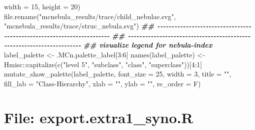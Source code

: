 \documentclass[
]{article}
\newenvironment{Shaded}{\begin{snugshade}}{\end{snugshade}}
\newcommand{\AttributeTok}[1]{\textcolor[rgb]{0.77,0.63,0.00}{#1}}
\newcommand{\DecValTok}[1]{\textcolor[rgb]{0.00,0.00,0.81}{#1}}
\newcommand{\DocumentationTok}[1]{\textcolor[rgb]{0.56,0.35,0.01}{\textbf{\textit{#1}}}}
\newcommand{\FunctionTok}[1]{\textcolor[rgb]{0.00,0.00,0.00}{#1}}
\newcommand{\NormalTok}[1]{#1}
\newcommand{\OtherTok}[1]{\textcolor[rgb]{0.56,0.35,0.01}{#1}}
\newcommand{\SpecialCharTok}[1]{\textcolor[rgb]{0.00,0.00,0.00}{#1}}
\newcommand{\StringTok}[1]{\textcolor[rgb]{0.31,0.60,0.02}{#1}}
\begin{document}
\begin{Shaded}
\begin{Highlighting}[]
                        \AttributeTok{width =} \DecValTok{15}\NormalTok{, }\AttributeTok{height =} \DecValTok{20}\NormalTok{)}
\FunctionTok{file.rename}\NormalTok{(}\StringTok{"mcnebula\_results/trace/child\_nebulae.svg"}\NormalTok{, }\StringTok{"mcnebula\_results/trace/struc\_nebula.svg"}\NormalTok{)}
\DocumentationTok{\#\# {-}{-}{-}{-}{-}{-}{-}{-}{-}{-}{-}{-}{-}{-}{-}{-}{-}{-}{-}{-}{-}{-}{-}{-}{-}{-}{-}{-}{-}{-}{-}{-}{-}{-}{-}{-}{-}{-}{-}{-}{-}{-}{-}{-}{-}{-}{-}{-}{-}{-}{-}{-}{-}{-}{-}{-}{-}{-}{-}{-}{-}{-}{-}{-}{-}{-}{-}{-}{-}{-} }
\DocumentationTok{\#\# {-}{-}{-}{-}{-}{-}{-}{-}{-}{-}{-}{-}{-}{-}{-}{-}{-}{-}{-}{-}{-}{-}{-}{-}{-}{-}{-}{-}{-}{-}{-}{-}{-}{-}{-}{-}{-}{-}{-}{-}{-}{-}{-}{-}{-}{-}{-}{-}{-}{-}{-}{-}{-}{-}{-}{-}{-}{-}{-}{-}{-}{-}{-}{-}{-}{-}{-}{-}{-}{-} }
\DocumentationTok{\#\# visualize legend for nebula{-}index}
\NormalTok{label\_palette }\OtherTok{\textless{}{-}}\NormalTok{ .MCn.palette\_label[}\DecValTok{3}\SpecialCharTok{:}\DecValTok{6}\NormalTok{]}
\FunctionTok{names}\NormalTok{(label\_palette) }\OtherTok{\textless{}{-}}\NormalTok{ Hmisc}\SpecialCharTok{::}\FunctionTok{capitalize}\NormalTok{(}\FunctionTok{c}\NormalTok{(}\StringTok{"level 5"}\NormalTok{, }\StringTok{"subclass"}\NormalTok{, }\StringTok{"class"}\NormalTok{, }\StringTok{"superclass"}\NormalTok{))[}\DecValTok{4}\SpecialCharTok{:}\DecValTok{1}\NormalTok{]}
\FunctionTok{mutate\_show\_palette}\NormalTok{(label\_palette, }\AttributeTok{font\_size =} \DecValTok{25}\NormalTok{,}
             \AttributeTok{width =} \DecValTok{3}\NormalTok{,}
             \AttributeTok{title =} \StringTok{""}\NormalTok{,}
             \AttributeTok{fill\_lab =} \StringTok{"Class{-}Hierarchy"}\NormalTok{,}
             \AttributeTok{xlab =} \StringTok{""}\NormalTok{, }\AttributeTok{ylab =} \StringTok{""}\NormalTok{, }\AttributeTok{re\_order =}\NormalTok{ F)}
\end{Highlighting}
\end{Shaded}

\hypertarget{file-export.extra1_syno.r}{%
\section{File: export.extra1\_syno.R}\label{file-export.extra1_syno.r}}
\end{document}
